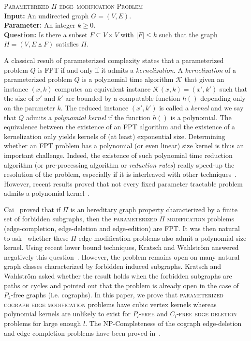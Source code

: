 \documentclass[11pt]{article}
\begin{document}
\medskip
\noindent
\textsc{Parameterized $\Pi$ edge--modification Problem}\\
\textbf{Input:} An undirected graph $G=(V,E)$.\\
\textbf{Parameter:} An integer $k\geqslant 0$.\\
\textbf{Question:} Is there a subset $F\subseteq V\times V$ with
$|F|\leqslant k$ such that the graph $H=(V,E\vartriangle F)$ satisfies $\Pi$.


\medskip
A classical result of parameterized complexity states that a parameterized problem $Q$ is FPT if and only if it admits a \emph{kernelization}. 
A \emph{kernelization} of a parameterized problem $Q$ is a polynomial time algorithm $\mathcal{K}$ that given an instance $(x,k)$ computes an equivalent instance $\mathcal{K}(x,k)=(x',k')$ such that the size of $x'$ and $k'$ are bounded by a computable function $h()$ depending only on the parameter $k$. The reduced instance $(x',k')$ is called a \emph{kernel} and we say that $Q$ admits a \emph{polynomial kernel} if the function $h()$ is a polynomial. The equivalence between  the existence of an FPT algorithm and the existence of a kernelization only yields kernels of (at least) exponential size. Determining whether an FPT problem has a polynomial (or even linear) size kernel is thus an important challenge. Indeed, the existence of such polynomial time reduction algorithm (or pre-processing algorithm or \emph{reduction rules}) really speed-up the resolution of the problem, especially if it is interleaved with other techniques~\cite{NR00}. However, recent results proved that not every fixed parameter tractable problem admits a polynomial kernel~\cite{BDFH08}. 

Cai~\cite{Cai96} proved that if $\Pi$ is an hereditary graph property characterized by a finite set of forbidden subgraphs, then the \textsc{parameterized $\Pi$ modification} problems (edge-completion, edge-deletion and edge-edition) are FPT. It was then natural to ask~\cite{Cai96} whether these $\Pi$ edge-modification problems also admit a polynomial size kernel. Using recent lower bound techniques, Kratsch and Wahlstr\"om answered negatively this question~\cite{KW09}. However, the problem remains open on many natural graph classes characterized by forbidden induced subgraphs. Kratsch and Wahlstr\"om asked whether the result holds when the forbidden subgraphs are paths or cycles and pointed out that the problem is already open in the case of $P_4$-free graphs (i.e. cographs). In this paper, we prove that \textsc{parameterized cograph edge modification} problems have cubic vertex kernels whereas polynomial kernels are unlikely to exist for \textsc{$P_l$-free} and \textsc{$C_l$-free edge deletion} problems for large enough $l$.
The NP-Completeness of the cograph edge-deletion and edge-completion problems have been proved in~\cite{EC88}.
\end{document}
